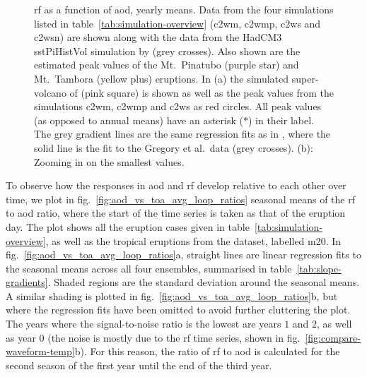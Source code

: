 \documentclass{ametsocV6.1}
\begin{document}
\begin{figure}
  \caption{\gls{rf} as a function of \gls{aod}, yearly means. Data from the four
    simulations listed in table~\ref{tab:simulation-overview} (\gls{c2wm}, \gls{c2wmp},
    \gls{c2ws} and \gls{c2wsn}) are shown along with the data from the HadCM3 sstPiHistVol
    simulation by \citet{gregory2016} (grey crosses). Also shown are the estimated peak
    values of the Mt.\ Pinatubo (purple star) and Mt.\ Tambora (yellow plus) eruptions. In
    (a) the simulated super-volcano of \citet{jones2005} (pink square) is shown as well as
    the peak values from the simulations \gls{c2wm}, \gls{c2wmp} and \gls{c2ws} as red
    circles. All peak values (as opposed to annual means) have an asterisk (\(\ast{}\)) in
    their label. The grey gradient lines are the same regression fits as in \citet[][Fig.\
      4]{gregory2016}, where the solid line is the fit to the Gregory et al.\ data (grey
    crosses). (b): Zooming in on the smallest values.}\label{fig:aod_vs_toa_ses_avg}%
\end{figure}

To observe how the responses in \gls{aod} and \gls{rf} develop relative to each other
over time, we plot in fig.~\ref{fig:aod_vs_toa_avg_loop_ratios} seasonal means of the
\gls{rf} to \gls{aod} ratio, where the start of the time series is taken as that of the
eruption day. The plot shows all the eruption cases given in
table~\ref{tab:simulation-overview}, as well as the tropical eruptions from the
\citet{marshall2020dataset} dataset, labelled \gls{m20}. In
fig.~\ref{fig:aod_vs_toa_avg_loop_ratios}a, straight lines are linear regression fits to
the seasonal means across all four ensembles, summarised in
table~\ref{tab:slope-gradients}. Shaded regions are the standard deviation around the
seasonal means. A similar shading is plotted in
fig.~\ref{fig:aod_vs_toa_avg_loop_ratios}b, but where the regression fits have been
omitted to avoid further cluttering the plot. The years where the signal-to-noise ratio
is the lowest are years \(1\) and \(2\), as well as year \(0\) (the noise is mostly due
to the \gls{rf} time series, shown in fig.~\ref{fig:compare-waveform-temp}b). For this
reason, the ratio of \gls{rf} to \gls{aod} is calculated for the second season of the
first year until the end of the third year.
\end{document}
